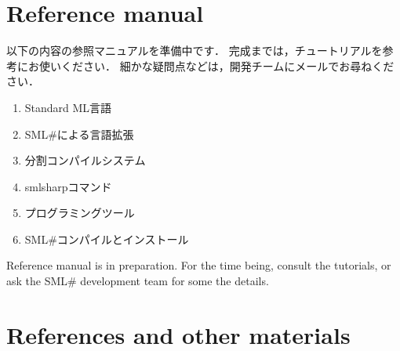 \documentclass{jbook}
\newcommand{\txt}[2]{#2}
\newcommand{\smlsharp}{SML\#}
\begin{document}
% 
% 
% 
	


\part{\txt{参照マニュアル}{Reference manual}}
\label{part:referenceManual}

\ifx\jp%
	以下の内容の参照マニュアルを準備中です．
	完成までは，チュートリアルを参考にお使いください．
	細かな疑問点などは，開発チームにメールでお尋ねください．
\begin{enumerate}
\item 
Standard ML言語
\item 
\smlsharp{}による言語拡張
\item 
分割コンパイルシステム
\item 
smlsharpコマンド
\item 
プログラミングツール
\item 
\smlsharp{}コンパイルとインストール
\end{enumerate}
\else%
	Reference manual is in preparation.
	For the time being, consult the tutorials, or ask the \smlsharp{}
development team for some the details.
\fi%
	

\part{\txt{参考文献，その他}{References and other materials}}
\label{part:bib}
\end{document}
